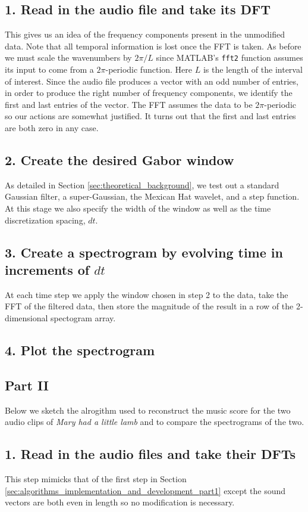 \documentclass[fleqn,10pt]{../SelfArx} %
\begin{document}
\subsection*{1. Read in the audio file and take its DFT}
This gives us an idea of the frequency components present in the unmodified data. Note that all temporal information is lost once the FFT is taken. As before we must scale the wavenumbers by $2\pi/L$ since MATLAB's \texttt{fft2} function assumes its input to come from a $2\pi$-periodic function. Here $L$ is the length of the interval of interest. Since the audio file produces a vector with an odd number of entries, in order to produce the right number of frequency components, we identify the first and last entries of the vector. The FFT assumes the data to be $2\pi$-periodic so our actions are somewhat justified. It turns out that the first and last entries are both zero in any case.

\subsection*{2. Create the desired Gabor window}
As detailed in Section \ref{sec:theoretical_background}, we test out a standard Gaussian filter, a super-Gaussian, the Mexican Hat wavelet, and a step function. At this stage we also specify the width of the window as well as the time discretization spacing, $dt$.

\subsection*{3. Create a spectrogram by evolving time in increments of $dt$}
At each time step we apply the window chosen in step 2 to the data, take the  FFT of the filtered data, then store the magnitude of the result in a row of the 2-dimensional spectogram array.

\subsection*{4. Plot the spectrogram}

\subsection{Part II}
Below we sketch the alrogithm used to reconstruct the music score for the two audio clips of \textit{Mary had a little lamb} and to compare the spectrograms of the two.

\subsection*{1. Read in the audio files and take their DFTs}
This step mimicks that of the first step in Section \ref{sec:algorithms_implementation_and_development_part1} except the sound vectors are both even in length so no modification is necessary.
\end{document}
